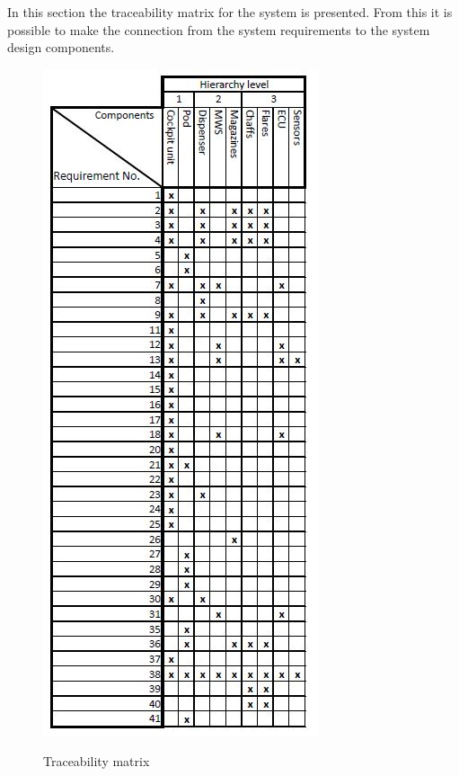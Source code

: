 In this section the traceability matrix for the system  is presented. From this it is possible to make the connection from the system requirements to the system design components.

\begin{figure}[h]
\centering
\includegraphics[scale=1]{./images/TraceabilityMatrix.JPG}\\
\caption{Traceability matrix}
\label{fig:traceabilityMatrix}
\end{figure}